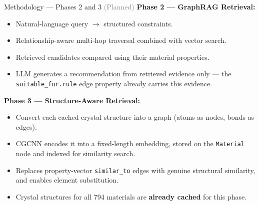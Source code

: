 \documentclass{beamer}
\begin{document}
\begin{frame}{Methodology --- Phases 2 and 3 \textcolor{gray}{(Planned)}}
\textbf{Phase 2 --- GraphRAG Retrieval:}
    \begin{itemize}
        \item Natural-language query $\rightarrow$ structured constraints.
        \item Relationship-aware multi-hop traversal combined with vector search.
        \item Retrieved candidates compared using their material properties.
        \item LLM generates a recommendation from retrieved evidence only --- the \texttt{suitable\_for.rule} edge property already carries this evidence.
    \end{itemize}

\vspace{0.3cm}
\textbf{Phase 3 --- Structure-Aware Retrieval:}
    \begin{itemize}
        \item Convert each cached crystal structure into a graph (atoms as nodes, bonds as edges).
        \item CGCNN encodes it into a fixed-length embedding, stored on the \texttt{Material} node and indexed for similarity search.
        \item Replaces property-vector \texttt{similar\_to} edges with genuine structural similarity, and enables element substitution.
        \item Crystal structures for all 794 materials are \textbf{already cached} for this phase.
    \end{itemize}
\end{frame}
\end{document}
